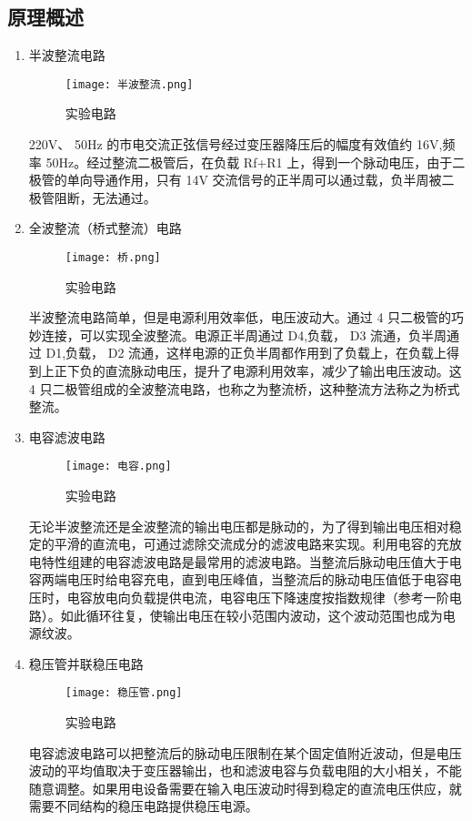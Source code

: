 \documentclass[dvipsnames, svgnames,a4paper,11pt]{article}
\begin{document}
	\subsection{原理概述}
	\begin{enumerate}
		\item 半波整流电路
		  \begin{figure}[{H}]
			\centering
			\texttt{[image: 半波整流.png]}
			\caption{实验电路}
			\label{}
		  \end{figure}
		  220V、 50Hz 的市电交流正弦信号经过变压器降压后的幅度有效值约 16V,频率 50Hz。经过整流二极管后，在负载 Rf+R1 上，得到一个脉动电压，由于二极管的单向导通作用，只有 14V 交流信号的正半周可以通过载，负半周被二极管阻断，无法通过。

	    \item 全波整流（桥式整流）电路
	    \begin{figure}[{H}]
			\centering
			\texttt{[image: 桥.png]}
			\caption{实验电路}
			\label{}
		\end{figure}
		半波整流电路简单，但是电源利用效率低，电压波动大。通过 4 只二极管的巧妙连接，可以实现全波整流。电源正半周通过 D4,负载， D3 流通，负半周通过 D1,负载， D2 流通，这样电源的正负半周都作用到了负载上，在负载上得到上正下负的直流脉动电压，提升了电源利用效率，减少了输出电压波动。这 4 只二极管组成的全波整流电路，也称之为整流桥，这种整流方法称之为桥式整流。
		\item 电容滤波电路
		\begin{figure}[{H}]
			\centering
			\texttt{[image: 电容.png]}
			\caption{实验电路}
			\label{}
		\end{figure}
		无论半波整流还是全波整流的输出电压都是脉动的，为了得到输出电压相对稳定的平滑的直流电，可通过滤除交流成分的滤波电路来实现。利用电容的充放电特性组建的电容滤波电路是最常用的滤波电路。当整流后脉动电压值大于电容两端电压时给电容充电，直到电压峰值，当整流后的脉动电压值低于电容电压时，电容放电向负载提供电流，电容电压下降速度按指数规律（参考一阶电路）。如此循环往复，使输出电压在较小范围内波动，这个波动范围也成为电源纹波。
		\item 稳压管并联稳压电路
		\begin{figure}[{H}]
			\centering
			\texttt{[image: 稳压管.png]}
			\caption{实验电路}
			\label{}
		\end{figure}
		电容滤波电路可以把整流后的脉动电压限制在某个固定值附近波动，但是电压波动的平均值取决于变压器输出，也和滤波电容与负载电阻的大小相关，不能随意调整。如果用电设备需要在输入电压波动时得到稳定的直流电压供应，就需要不同结构的稳压电路提供稳压电源。


\end{enumerate}
\end{document}
